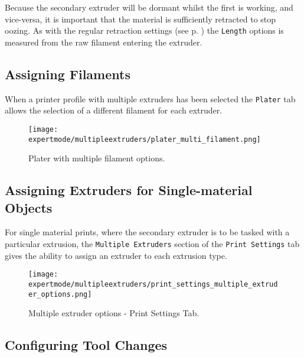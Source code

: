 Because the secondary extruder will be dormant whilst the first is working, and vice-versa, it is important that the material is sufficiently retracted to stop oozing.  As with the regular retraction settings (see p. \pageref{fig:retraction_settings}) the \texttt{Length} options is measured from the raw filament entering the extruder.


\subsection{Assigning Filaments} %
\label{sub:assigning_filaments}

When a printer profile with multiple extruders has been selected the \texttt{Plater} tab allows the selection of a different filament for each extruder. 

\begin{figure}[H]
\centering
\texttt{[image: expertmode/multipleextruders/plater\_multi\_filament.png]}
\caption{Plater with multiple filament options.}
\label{fig:plater_multi_filament}
\end{figure}


\subsection{Assigning Extruders for Single-material Objects} %
\label{sub:assigning_extruders}

For single material prints, where the secondary extruder is to be tasked with a particular extrusion, the \texttt{Multiple Extruders} section of the \texttt{Print Settings} tab gives the ability to assign an extruder to each extrusion type.

\begin{figure}[H]
\centering
\texttt{[image: expertmode/multipleextruders/print\_settings\_multiple\_extruder\_options.png]}
\caption{Multiple extruder options - Print Settings Tab.}
\label{fig:advanced_multiple_extruder_options}
\end{figure}


\subsection{Configuring Tool Changes} %
\label{sub:configuring_tool_changes}

